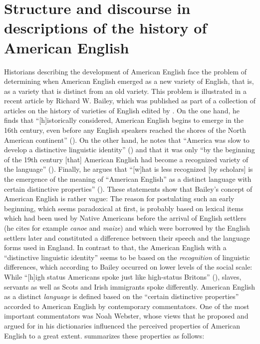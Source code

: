 \section{Structure and discourse in descriptions of the history of American English}
\label{bkm:Ref517077661}\hypertarget{Toc63021216}{}
Historians describing the development of American English face the problem of determining when American English emerged as a new variety of English, that is, as a variety that is distinct from an old variety. This problem is illustrated in a recent article by Richard W. Bailey, which was published as part of a collection of articles on the history of varieties of English edited by \citet{Bergs2017}. On the one hand, he finds that “[h]istorically considered, American English begins to emerge in the 16th century, even before any English speakers reached the shores of the North American continent” (\citeyear[9]{Bailey2017}). On the other hand, he notes that “America was slow to develop a distinctive linguistic identity” (\citeyear[10]{Bailey2017}) and that it was only “by the beginning of the 19th century [that] American English had become a recognized variety of the language” (\citeyear[12]{Bailey2017}). Finally, he argues that “[w]hat is less recognized [by scholars] is the emergence of the meaning of “American English” as a distinct language with certain distinctive properties” (\citeyear[13]{Bailey2017}). These statements show that Bailey’s concept of American English is rather vague: The reason for postulating such an early beginning, which seems paradoxical at first, is probably based on lexical items which had been used by Native Americans before the arrival of English settlers (he cites for example \emph{canoe} and \emph{maize}) and which were borrowed by the English settlers later and constituted a difference between their speech and the language forms used in England. In contrast to that, the American English with a “distinctive linguistic identity” seems to be based on the \emph{recognition} of linguistic differences, which according to Bailey occurred on lower levels of the social scale: While “[h]igh status Americans spoke just like high-status Britons” (\citeyear[12]{Bailey2017}), slaves, servants as well as Scots and Irish immigrants spoke differently. American English as a distinct \textit{language} is defined based on the “certain distinctive properties” accorded to American English by contemporary commentators. One of the most important commentators was Noah Webster, whose views that he proposed and argued for in his dictionaries influenced the perceived properties of American English to a great extent. \citet[16]{Bailey2017} summarizes these properties as follows:


